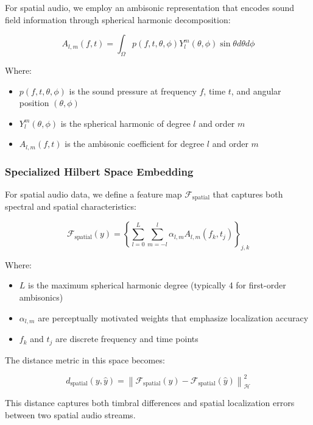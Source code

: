For spatial audio, we employ an ambisonic representation that encodes sound field information through spherical harmonic decomposition:

\begin{equation}
A_{l,m}(f,t) = \int_{\Omega} p(f,t,\theta,\phi) Y_l^m(\theta,\phi) \sin\theta d\theta d\phi
\end{equation}

Where:
\begin{itemize}
\item $p(f,t,\theta,\phi)$ is the sound pressure at frequency $f$, time $t$, and angular position $(\theta,\phi)$
\item $Y_l^m(\theta,\phi)$ is the spherical harmonic of degree $l$ and order $m$
\item $A_{l,m}(f,t)$ is the ambisonic coefficient for degree $l$ and order $m$
\end{itemize}

\subsubsection{Specialized Hilbert Space Embedding}

For spatial audio data, we define a feature map $\mathcal{F}_{\text{spatial}}$ that captures both spectral and spatial characteristics:

\begin{equation}
\mathcal{F}_{\text{spatial}}(y) = \left\{ \sum_{l=0}^{L} \sum_{m=-l}^{l} \alpha_{l,m} A_{l,m}(f_k,t_j) \right\}_{j,k}
\end{equation}

Where:
\begin{itemize}
\item $L$ is the maximum spherical harmonic degree (typically 4 for first-order ambisonics)
\item $\alpha_{l,m}$ are perceptually motivated weights that emphasize localization accuracy
\item $f_k$ and $t_j$ are discrete frequency and time points
\end{itemize}

The distance metric in this space becomes:

\begin{equation}
d_{\text{spatial}}(y, \hat{y}) = \left\| \mathcal{F}_{\text{spatial}}(y) - \mathcal{F}_{\text{spatial}}(\hat{y}) \right\|_{\mathcal{H}}^2
\end{equation}

This distance captures both timbral differences and spatial localization errors between two spatial audio streams.

